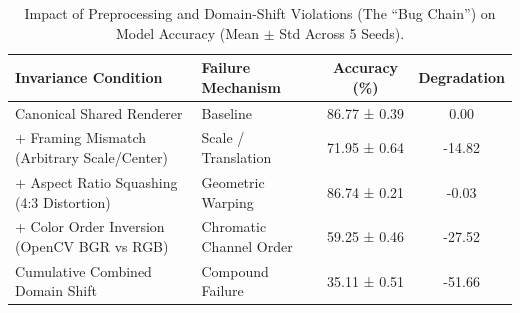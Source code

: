 \begin{table}[t]
\centering
\caption{Impact of Preprocessing and Domain-Shift Violations (The ``Bug Chain'') on Model Accuracy (Mean $\pm$ Std Across 5 Seeds).}
\label{tab:domain_shift}
\begin{tabular}{llcc}
\toprule
\textbf{Invariance Condition} & \textbf{Failure Mechanism} & \textbf{Accuracy (\%)} & \textbf{Degradation} \\
\midrule
Canonical Shared Renderer & Baseline & 86.77 ± 0.39 & 0.00 \\
+ Framing Mismatch (Arbitrary Scale/Center) & Scale / Translation & 71.95 ± 0.64 & -14.82 \\
+ Aspect Ratio Squashing (4:3 Distortion) & Geometric Warping & 86.74 ± 0.21 & -0.03 \\
+ Color Order Inversion (OpenCV BGR vs RGB) & Chromatic Channel Order & 59.25 ± 0.46 & -27.52 \\
Cumulative Combined Domain Shift & Compound Failure & 35.11 ± 0.51 & -51.66 \\
\bottomrule
\end{tabular}
\end{table}

